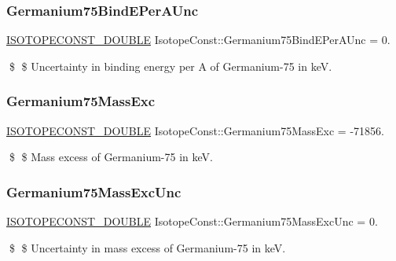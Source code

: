 \subsubsection{\texorpdfstring{Germanium75\+Bind\+E\+Per\+A\+Unc}{Germanium75BindEPerAUnc}}
{\footnotesize\ttfamily \mbox{\hyperlink{group___isotope_const-_macros_ga8f45a7272ce02c0b4c65c44636ed719a}{I\+S\+O\+T\+O\+P\+E\+C\+O\+N\+S\+T\+\_\+\+D\+O\+U\+B\+LE}} Isotope\+Const\+::\+Germanium75\+Bind\+E\+Per\+A\+Unc = 0.}

\$ \$ Uncertainty in binding energy per A of Germanium-\/75 in keV. \mbox{\label{group___isotope_const-_germanium-_ge75_ga86b0fe0cff3eecdc8026abee40afb1a5}} 
\subsubsection{\texorpdfstring{Germanium75\+Mass\+Exc}{Germanium75MassExc}}
{\footnotesize\ttfamily \mbox{\hyperlink{group___isotope_const-_macros_ga8f45a7272ce02c0b4c65c44636ed719a}{I\+S\+O\+T\+O\+P\+E\+C\+O\+N\+S\+T\+\_\+\+D\+O\+U\+B\+LE}} Isotope\+Const\+::\+Germanium75\+Mass\+Exc = -\/71856.}

\$ \$ Mass excess of Germanium-\/75 in keV. \mbox{\label{group___isotope_const-_germanium-_ge75_ga551ec3899b8f533f704ccac506cedec3}} 
\subsubsection{\texorpdfstring{Germanium75\+Mass\+Exc\+Unc}{Germanium75MassExcUnc}}
{\footnotesize\ttfamily \mbox{\hyperlink{group___isotope_const-_macros_ga8f45a7272ce02c0b4c65c44636ed719a}{I\+S\+O\+T\+O\+P\+E\+C\+O\+N\+S\+T\+\_\+\+D\+O\+U\+B\+LE}} Isotope\+Const\+::\+Germanium75\+Mass\+Exc\+Unc = 0.}

\$ \$ Uncertainty in mass excess of Germanium-\/75 in keV. \mbox{\label{group___isotope_const-_germanium-_ge75_gac488f5dfd5b1c55e05b154057dca9867}} 
